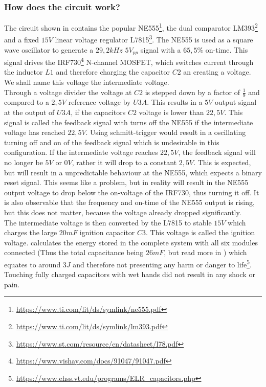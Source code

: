 \pagebreak

\subsubsection{How does the circuit work?}

\noindent The circuit shown in  contains the popular NE555\footnote{\url{ https://www.ti.com/lit/ds/symlink/ne555.pdf}}, the dual comparator LM393\footnote{\url{https://www.ti.com/lit/ds/symlink/lm393.pdf}} and a fixed $15V$ linear voltage regulator L7815\footnote{\url{https://www.st.com/resource/en/datasheet/l78.pdf}}. The NE555 is used as a square wave oscillator to generate a $29,2kHz$ $5V_{pp}$ signal with a $65,5\%$ on-time. This signal drives the IRF730\footnote{\url{https://www.vishay.com/docs/91047/91047.pdf}} N-channel MOSFET, which switches current through the inductor $L1$ and therefore charging the capacitor $C2$ an creating a voltage. We shall name this voltage the intermediate voltage.\\

\noindent Through a voltage divider the voltage at $C2$ is stepped down by a factor of $\frac{1}{9}$ and compared to a $2,5V$ reference voltage by $U3A$. This results in a $5V$ output signal at the output of $U3A$, if the capacitors $C2$ voltage is lower than $22,5V$. This signal is called the feedback signal with turns off the NE555 if the intermediate voltage has reached $22,5V$. Using schmitt-trigger would result in a oscillating turning off and on of the feedback signal which is undesirable in this configuration. If the intermediate voltage reaches $22,5V$, the feedback signal will no longer be $5V$ or $0V$, rather it will drop to a constant $2,5V$. This is expected, but will result in a unpredictable behaviour at the NE555, which expects a binary reset signal. This seems like a problem, but in reality will result in the NE555 output voltage to drop below the on-voltage of the IRF730, thus turning it off. It is also observable that the frequency and on-time of the NE555 output is rising, but this does not matter, because the voltage already dropped significantly. \\

\noindent The intermediate voltage is then converted by the L7815 to stable $15V$ which charges the large $20mF$ ignition capacitor $C3$. This voltage is called the ignition voltage. calculates the energy stored in the complete system with all six modules connected (Thus the total capacitance being $26mF$, but read more in ) which equates to around $3J$ and therefore not presenting any harm or danger to life\footnote{\url{https://www.ehss.vt.edu/programs/ELR_capacitors.php}}. Touching fully charged capacitors with wet hands did not result in any shock or pain.\\

